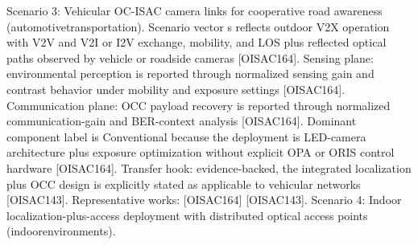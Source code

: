 {}
\markdownRendererSectionEnd \markdownRendererSectionBegin
{}\markdownRendererInterblockSeparator
{}Scenario 3: Vehicular OC-ISAC camera links for cooperative road awareness (automotive\markdownRendererUnderscore{}transportation).\markdownRendererHardLineBreak
{}Scenario vector s reflects outdoor V2X operation with V2V and V2I or I2V exchange, mobility, and LOS plus reflected optical paths observed by vehicle or roadside cameras [O\markdownRendererUnderscore{}ISAC\markdownRendererUnderscore{}164]. Sensing plane: environmental perception is reported through normalized sensing gain and contrast behavior under mobility and exposure settings [O\markdownRendererUnderscore{}ISAC\markdownRendererUnderscore{}164]. Communication plane: OCC payload recovery is reported through normalized communication-gain and BER-context analysis [O\markdownRendererUnderscore{}ISAC\markdownRendererUnderscore{}164]. Dominant component label is Conventional because the deployment is LED-camera architecture plus exposure optimization without explicit OPA or ORIS control hardware [O\markdownRendererUnderscore{}ISAC\markdownRendererUnderscore{}164]. Transfer hook: evidence-backed, the integrated localization plus OCC design is explicitly stated as applicable to vehicular networks [O\markdownRendererUnderscore{}ISAC\markdownRendererUnderscore{}143]. Representative works: [O\markdownRendererUnderscore{}ISAC\markdownRendererUnderscore{}164] [O\markdownRendererUnderscore{}ISAC\markdownRendererUnderscore{}143].\markdownRendererParagraphSeparator
{}Scenario 4: Indoor localization-plus-access deployment with distributed optical access points (indoor\markdownRendererUnderscore{}environments).\markdownRendererHardLineBreak
